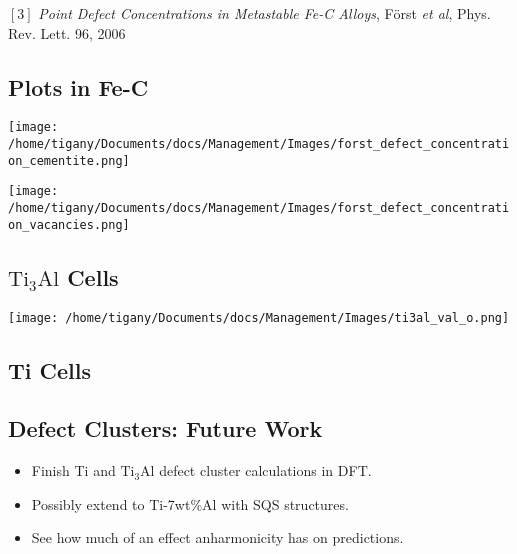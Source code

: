 \documentclass[11pt]{article}
\begin{document}
\([3]\) \emph{Point Defect Concentrations in Metastable Fe-C Alloys}, Först \emph{et
al}, Phys. Rev. Lett. 96, 2006



\subsection*{Plots in Fe-C}
\label{sec:orgee3b694}
\begin{center}
\texttt{[image: /home/tigany/Documents/docs/Management/Images/forst\_defect\_concentration\_cementite.png]}
\label{org9f5fd4a}
\end{center}

\begin{center}
\texttt{[image: /home/tigany/Documents/docs/Management/Images/forst\_defect\_concentration\_vacancies.png]}
\label{orgff7425a}
\end{center}

\subsection*{\(\text{Ti}_{3}\text{Al}\)  Cells}
\label{sec:org42d2e7e}
\begin{center}
\texttt{[image: /home/tigany/Documents/docs/Management/Images/ti3al\_val\_o.png]}
\label{org04ceecc}
\end{center}

\subsection*{Ti Cells}
\label{sec:orgad3a9ad}


\subsection*{Defect Clusters: Future Work}
\label{sec:org959d9ae}
\begin{itemize}
\item Finish Ti and \(\text{Ti}_{3}\text{Al}\) defect cluster calculations in DFT.
\item Possibly extend to Ti-7wt\%Al with SQS structures.
\item See how much of an effect anharmonicity has on predictions.
\end{itemize}
\end{document}
